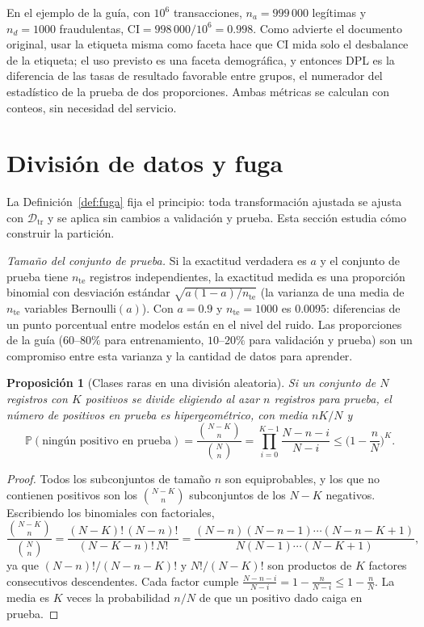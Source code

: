 \documentclass[11pt]{article}
\newtheorem{proposicion}[teorema]{Proposición}
\theoremstyle{definition}
\theoremstyle{remark}
\newcommand{\Prob}{\mathbb{P}}
\newcommand{\Dtr}{\mathcal{D}_{\mathrm{tr}}}
\begin{document}
\noindent En el ejemplo de la guía, con $10^6$ transacciones, $n_a=999\,000$ legítimas y $n_d=1000$ fraudulentas, $\mathrm{CI}=998\,000/10^6=0.998$. Como advierte el documento original, usar la etiqueta misma como faceta hace que CI mida solo el desbalance de la etiqueta; el uso previsto es una faceta demográfica, y entonces DPL es la diferencia de las tasas de resultado favorable entre grupos, el numerador del estadístico de la prueba de dos proporciones. Ambas métricas se calculan con conteos, sin necesidad del servicio.

\section{División de datos y fuga}\label{sec:division}

\noindent La Definición~\ref{def:fuga} fija el principio: toda transformación ajustada se ajusta con $\Dtr$ y se aplica sin cambios a validación y prueba. Esta sección estudia cómo construir la partición.

\medskip

\noindent \emph{Tamaño del conjunto de prueba.} Si la exactitud verdadera es $a$ y el conjunto de prueba tiene $n_{\mathrm{te}}$ registros independientes, la exactitud medida es una proporción binomial con desviación estándar $\sqrt{a(1-a)/n_{\mathrm{te}}}$ (la varianza de una media de $n_{\mathrm{te}}$ variables Bernoulli$(a)$). Con $a=0.9$ y $n_{\mathrm{te}}=1000$ es $0.0095$: diferencias de un punto porcentual entre modelos están en el nivel del ruido. Las proporciones de la guía ($60$--$80\%$ para entrenamiento, $10$--$20\%$ para validación y prueba) son un compromiso entre esta varianza y la cantidad de datos para aprender.

\begin{proposicion}[Clases raras en una división aleatoria]\label{prop:hiper}
\noindent Si un conjunto de $N$ registros con $K$ positivos se divide eligiendo al azar $n$ registros para prueba, el número de positivos en prueba es hipergeométrico, con media $nK/N$ y
\[
\Prob(\text{ningún positivo en prueba})=\frac{\binom{N-K}{n}}{\binom Nn}=\prod_{i=0}^{K-1}\frac{N-n-i}{N-i}\le\Big(1-\frac nN\Big)^K.
\]
\end{proposicion}
\begin{proof}
\noindent Todos los subconjuntos de tamaño $n$ son equiprobables, y los que no contienen positivos son los $\binom{N-K}n$ subconjuntos de los $N-K$ negativos. Escribiendo los binomiales con factoriales,
\[
\frac{\binom{N-K}n}{\binom Nn}=\frac{(N-K)!\,(N-n)!}{(N-K-n)!\,N!}=\frac{(N-n)(N-n-1)\cdots(N-n-K+1)}{N(N-1)\cdots(N-K+1)},
\]
ya que $(N-n)!/(N-n-K)!$ y $N!/(N-K)!$ son productos de $K$ factores consecutivos descendentes. Cada factor cumple $\frac{N-n-i}{N-i}=1-\frac n{N-i}\le1-\frac nN$. La media es $K$ veces la probabilidad $n/N$ de que un positivo dado caiga en prueba.
\end{proof}
\end{document}
